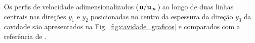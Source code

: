 \documentclass[tese_patricia]{subfiles}%
\begin{document}
Os perfis de velocidade adimensionalizados ($\mathbf{u}/\mathbf{u}_{\infty}$) ao longo de duas linhas centrais nas direções $y_1$ e $y_2$ posicionadas no centro da espessura da direção $y_3$ da cavidade são apresentados na Fig. \ref{fig:cavidade_graficos} e comparados com a referência de .


\begin{figure}[!t]
	\centering
	 \\ 

\end{figure}
\end{document}
